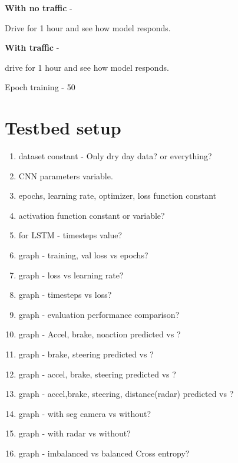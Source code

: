 \textbf{With no traffic} -

Drive for 1 hour and see how model responds.

\textbf{With traffic} -

drive for 1 hour and see how model responds.

Epoch training - 50
\section{Testbed setup}

\begin{enumerate}
    \item dataset constant - Only dry day data?
        or everything?
    \item CNN parameters variable.
    \item epochs, learning rate, optimizer, loss function constant
    \item activation function constant or variable?
    \item for LSTM - timesteps value?
    \item graph - training, val loss vs epochs?
    \item graph - loss vs learning rate?
    \item graph - timesteps vs loss?
    \item graph - evaluation performance comparison?
    \item graph - Accel, brake, noaction predicted vs ?
    \item graph - brake, steering predicted vs ?
    \item graph - accel, brake, steering predicted vs ?
    \item graph - accel,brake, steering, distance(radar) predicted vs ?
    \item graph - with seg camera vs without?
    \item graph - with radar vs without?
    \item graph - imbalanced vs balanced Cross entropy?


\end{enumerate}
\fi
